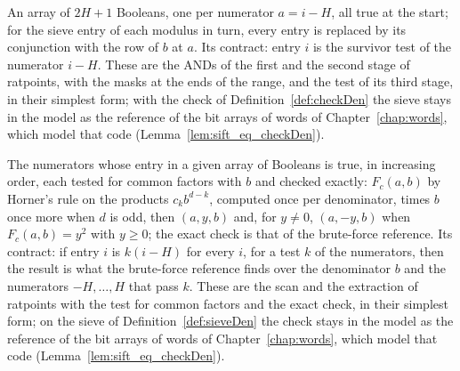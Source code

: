 \begin{definition}\label{def:sieveDen}
  \leanok
  An array of $2H + 1$ Booleans, one per numerator $a = i - H$, all true at the start; for the sieve
  entry of each modulus in turn, every entry is replaced by its conjunction with the row of $b$ at
  $a$. Its contract: entry $i$ is the survivor test of the numerator $i - H$. These are the ANDs of
  the first and the second stage of ratpoints, with the masks at the ends of the range, and the test
  of its third stage, in their simplest form; with the check of Definition~\ref{def:checkDen} the
  sieve stays in the model as the reference of the bit arrays of words of Chapter~\ref{chap:words},
  which model that code (Lemma~\ref{lem:sift_eq_checkDen}).
\end{definition}

\begin{definition}\label{def:checkDen}
  \leanok
  The numerators whose entry in a given array of Booleans is true, in increasing order, each tested
  for common factors with $b$ and checked exactly: $F_c(a, b)$ by Horner's rule on the products
  $c_k b^{d-k}$, computed once per denominator, times $b$ once more when $d$ is odd, then
  $(a, y, b)$ and, for $y \ne 0$, $(a, -y, b)$ when $F_c(a, b) = y^2$ with $y \ge 0$; the exact
  check is that of the brute-force reference. Its contract: if entry $i$ is $k(i - H)$ for every
  $i$, for a test $k$ of the numerators, then the result is what the brute-force reference finds
  over the denominator $b$ and the numerators $-H, \dots, H$ that pass $k$. These are the scan and
  the extraction of ratpoints with the test for common factors and the exact check, in their
  simplest form; on the sieve of Definition~\ref{def:sieveDen} the check stays in the model as the
  reference of the bit arrays of words of Chapter~\ref{chap:words}, which model that code
  (Lemma~\ref{lem:sift_eq_checkDen}).
\end{definition}

